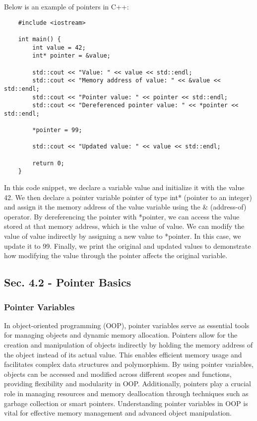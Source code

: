 \begin{solution}
    Below is an example of pointers in C++:

    \horizontalline

    \begin{verbatim}    
    #include <iostream>

    int main() {
        int value = 42;
        int* pointer = &value;
    
        std::cout << "Value: " << value << std::endl;
        std::cout << "Memory address of value: " << &value << std::endl;
        std::cout << "Pointer value: " << pointer << std::endl;
        std::cout << "Dereferenced pointer value: " << *pointer << std::endl;
    
        *pointer = 99;
    
        std::cout << "Updated value: " << value << std::endl;
    
        return 0;
    }
        \end{verbatim}
    
        \horizontalline
        
    In this code snippet, we declare a variable value and initialize it with the value 42. We then declare a pointer variable pointer of type int* (pointer to an integer) and assign it the memory address of the value variable using 
    the \& (address-of) operator. By dereferencing the pointer with *pointer, we can access the value stored at that memory address, which is the value of value. We can modify the value of value indirectly by assigning a new value 
    to *pointer. In this case, we update it to 99. Finally, we print the original and updated values to demonstrate how modifying the value through the pointer affects the original variable.
\end{solution}

\subsection*{Sec. 4.2 - Pointer Basics}

\subsubsection{Pointer Variables}

In object-oriented programming (OOP), pointer variables serve as essential tools for managing objects and dynamic memory allocation. Pointers allow for the creation and manipulation of objects indirectly by holding the memory address 
of the object instead of its actual value. This enables efficient memory usage and facilitates complex data structures and polymorphism. By using pointer variables, objects can be accessed and modified across different scopes and functions, 
providing flexibility and modularity in OOP. Additionally, pointers play a crucial role in managing resources and memory deallocation through techniques such as garbage collection or smart pointers. Understanding pointer variables in OOP 
is vital for effective memory management and advanced object manipulation.

